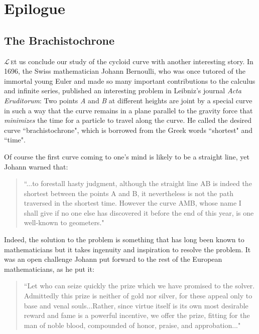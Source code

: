 \chapter{Epilogue}
\setcounter{section}{0}
\section{The Brachistochrone\hfill}
\lettrine[lines=2]{$\mathcal{L}$\,}\lowercase{e}t us conclude our study of the cycloid curve with another interesting story\cite{dunham1990journey}.
In 1696,  the Swiss mathematician 
Johann Bernoulli, who was once tutored of the immortal young Euler and made so many important contributions to the calculus and infinite series, published an
interesting problem in Leibniz's journal {\it Acta Eruditorum}: Two points {\it A} and
{\it B} at different heights are joint by a special curve in such a way that
the curve remains in a plane parallel to the gravity force that {\it minimizes} the time
for a particle to travel along the curve. He called the desired curve ``brachistochrone", which is borrowed from the Greek words ``shortest" and ``time".

Of course the first curve coming to one's mind is likely to be a straight line, yet
Johann warned that:
 \begin{quotation}
``...to forestall hasty judgment, although the straight line AB is indeed the shortest between the points A and B, it nevertheless is not the path traversed in the shortest time. However the curve AMB, whose name I shall give if no
one else has discovered it before the end of this year, is one well-known to geometers."\cite{dunham1990journey}
 \end{quotation}
 
 Indeed, the solution to the problem is something that has long been known to 
 mathematicians but it takes ingenuity and inspiration to resolve the 
 problem. It was an open challenge Johann put forward to the rest of the European mathematicians, as he put it:
  \begin{quotation}
 ``Let who can seize quickly the prize which we have promised to the solver. Admittedly this prize is neither of gold nor silver, for these appeal only to base and venal souls...Rather, since virtue itself is its own most desirable reward and fame is a powerful incentive, we offer the prize, fitting for the man of noble blood, compounded of honor, praise, and approbation..."\cite{dunham1990journey}
   \end{quotation}
   
